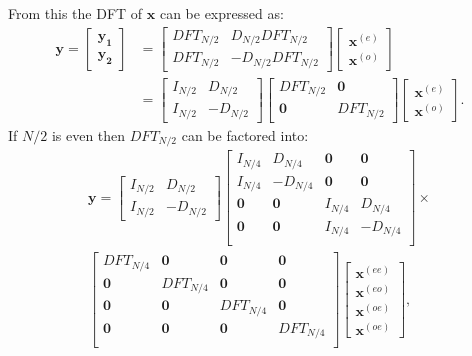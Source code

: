 From this the DFT of $\textbf{x}$ can be expressed as: 
\begin{align*}
    \mathbf{y}=
    \begin{bmatrix}
        \mathbf{y_1}\\
        \mathbf{y_2}
    \end{bmatrix}
    &=
    \begin{bmatrix}
        DFT_{N/2} & D_{N/2}DFT_{N/2} \\
        DFT_{N/2} & -D_{N/2}DFT_{N/2}
    \end{bmatrix}
    \begin{bmatrix}
        \mathbf{x}^{(e)} \\
        \mathbf{x}^{(o)}
    \end{bmatrix}\\
    &=
    \begin{bmatrix}
        I_{N/2} & D_{N/2} \\
        I_{N/2} & -D_{N/2}
    \end{bmatrix}
    \begin{bmatrix}
        DFT_{N/2} & \mathbf{0} \\
        \mathbf{0} & DFT_{N/2}
    \end{bmatrix}
    \begin{bmatrix}
        \mathbf{x}^{(e)} \\
        \mathbf{x}^{(o)}
    \end{bmatrix}.
\end{align*}
If $N/2$ is even then $DFT_{N/2}$ can be factored into:
\begin{align*}
        \mathbf{y}=
    \begin{bmatrix}
        I_{N/2} & D_{N/2} \\
        I_{N/2} & -D_{N/2}
    \end{bmatrix}
    \begin{bmatrix}
        I_{N/4} & D_{N/4} & \mathbf{0} & \mathbf{0} \\
        I_{N/4} & -D_{N/4} & \mathbf{0} & \mathbf{0} \\
        \mathbf{0} & \mathbf{0} & I_{N/4} & D_{N/4}  \\
        \mathbf{0} & \mathbf{0} & I_{N/4} & -D_{N/4} \\
    \end{bmatrix}\times\\
    \begin{bmatrix}
        DFT_{N/4} & \mathbf{0} & \mathbf{0} & \mathbf{0} \\
        \mathbf{0} & DFT_{N/4} & \mathbf{0} & \mathbf{0} \\
        \mathbf{0} & \mathbf{0} & DFT_{N/4} & \mathbf{0} \\
        \mathbf{0} & \mathbf{0} & \mathbf{0} & DFT_{N/4} \\
    \end{bmatrix}
    \begin{bmatrix}
        \mathbf{x}^{(ee)} \\
        \mathbf{x}^{(eo)} \\
        \mathbf{x}^{(oe)} \\
        \mathbf{x}^{(oe)}
    \end{bmatrix},
\end{align*}
